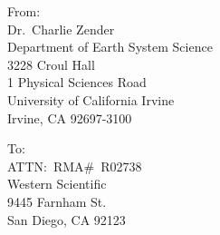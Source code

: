 \documentclass[12pt]{article}
\begin{document}
\pagestyle{plain}
\thispagestyle{empty}
\Large
\noindent
From:\\
Dr.~Charlie Zender\\
Department of Earth System Science\\
3228 Croul Hall\\
1 Physical Sciences Road\\
University of California Irvine\\
Irvine, CA 92697-3100\\

\bigskip
\hspace{2.0in}%
\begin{minipage}{3.0in} %
\noindent
To:\\
\Huge
ATTN:~RMA\#~R02738\\
Western Scientific\\
9445 Farnham St.\\
San Diego, CA 92123\\
\end{minipage}
\end{document}
